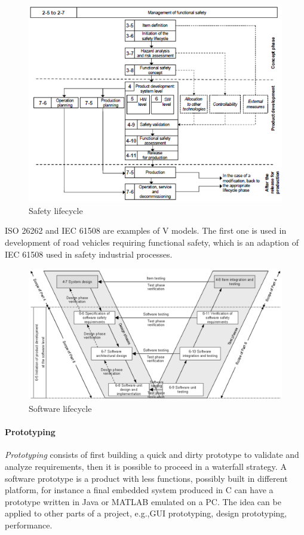 \begin{figure}[hbtp]
\centering
\includegraphics[scale=0.3]{images/safety_lifecycle.png}
\caption{Safety lifecycle}
\end{figure}

ISO 26262 and IEC 61508 are examples of V models. The first one is used in development of road vehicles requiring functional safety, which is an adaption of IEC 61508 used in safety industrial processes.

\begin{figure}[hbtp]
\centering
\includegraphics[scale=0.3]{images/software_lifecycle.png}
\caption{Software lifecycle}
\end{figure}

\paragraph{Prototyping}
\emph{Prototyping} consists of first building a quick and dirty prototype to validate and analyze requirements, then it is possible to proceed in a waterfall strategy. A software prototype is a product with less functions, possibly built in different platform, for instance a final embedded system produced in C can have a prototype written in Java or MATLAB emulated on a PC. The idea can be applied to other parts of a project, e.g.,\@ GUI prototyping, design prototyping, performance.

